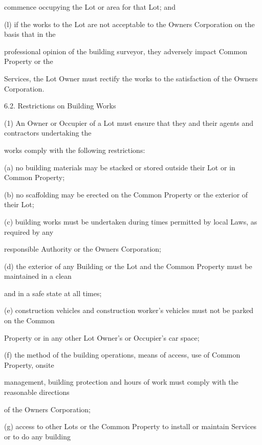 \documentclass{article}
\begin{document}
{\fontsize{10.02}{1}commence occupying the Lot or area for that Lot; and }

{\fontsize{9.962}{1}(l) if the works to the Lot are not acceptable to the Owners Corporation on the basis that in the }

{\fontsize{10.02}{1}professional opinion of the building surveyor, they adversely impact Common Property or the }

{\fontsize{10.02}{1}Services, the Lot Owner must rectify the works to the satisfaction of the Owners Corporation. }

{\fontsize{9.99}{1}6.2. Restrictions on Building Works }

{\fontsize{9.962}{1}(1) An Owner or Occupier of a Lot must ensure that they and their agents and contractors undertaking the }

{\fontsize{10.02}{1}works comply with the following restrictions: }

{\fontsize{9.962}{1}(a) no building materials may be stacked or stored outside their Lot or in Common Property; }

{\fontsize{9.962}{1}(b) no scaffolding may be erected on the Common Property or the exterior of their Lot; }

{\fontsize{9.962}{1}(c) building works must be undertaken during times permitted by local Laws, as required by any }

{\fontsize{10.02}{1}responsible Authority or the Owners Corporation; }

{\fontsize{9.962}{1}(d) the exterior of any Building or the Lot and the Common Property must be maintained in a clean }

{\fontsize{10.02}{1}and in a safe state at all times; }

{\fontsize{9.962}{1}(e) construction vehicles and construction worker’s vehicles must not be parked on the Common }

{\fontsize{10.02}{1}Property or in any other Lot Owner’s or Occupier’s car space; }

{\fontsize{9.962}{1}(f) the method of the building operations, means of access, use of Common Property, onsite }

{\fontsize{10.02}{1}management, building protection and hours of work must comply with the reasonable directions }

{\fontsize{10.02}{1}of the Owners Corporation; }

{\fontsize{9.962}{1}(g) access to other Lots or the Common Property to install or maintain Services or to do any building }
\end{document}
